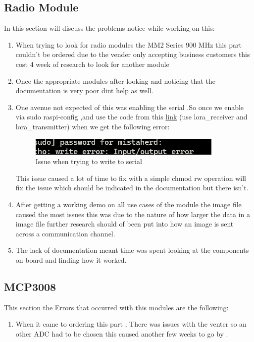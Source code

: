 \subsection{Radio Module}
In this section will discuss the problems notice while working on this:
\begin{enumerate}
    \item When trying to look for radio modules the MM2 Series 900 MHz this part couldn't be ordered due to the vender only accepting business customers this cost 4 week of research to look for another module
    \item Once the appropriate modules  after looking and noticing that the documentation is very poor dint help as well.
    \item One avenue not expected of this was enabling the serial .So once we enable via sudo raspi-config ,and use the code from this \href{https://github.com/sbcshop/Lora-HAT-for-Raspberry-Pi}{link} (use lora_receiver and lora_transmitter) when we get the following error:

    \begin{figure}[h!]
        \centering
        \includegraphics[width=0.5\linewidth]{Images/write_issue_linux_ser.png}
        \caption{Issue when trying to write to serial }
        \label{Issue when trying to write to serial}
    \end{figure}
    This issue caused a lot of time to fix with a simple chmod rw operation will fix the issue which should be  indicated in the documentation but there isn't.
    \item After getting a working demo on all use cases  of the module the image file caused  the most issues this was due to the nature of how larger the data in a  image file further research should of been put into  how an image is  sent across a communication channel.
    \item The lack of documentation meant time was spent looking at the components on board and  finding how it worked. 
\end{enumerate}
\subsection{MCP3008}
This section the Errors that occurred with this modules are the following:
\begin{enumerate}
    \item When it came to ordering this part , There was issues with the venter so an other ADC had to be chosen this caused another few weeks to go by .
\end{enumerate}
